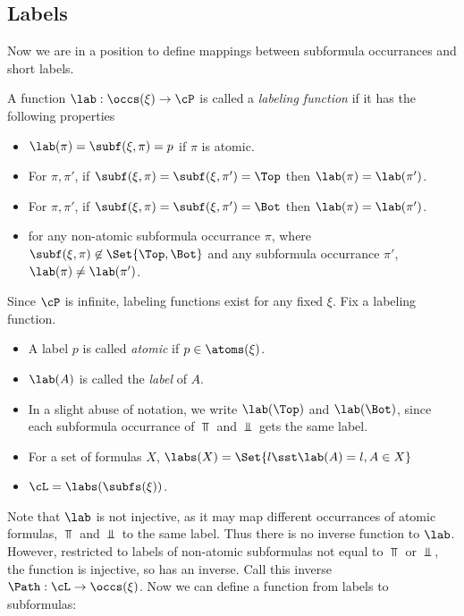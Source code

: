 \subsection{Labels}

Now we are in a position to define mappings between subformula occurrances
and short labels.

\begin{definition}[Labeling]
  A function $\lab : \occs(\xi)\to\cP$ is called a \emph{labeling function} if
  it has the following properties
  \begin{itemize}
  \item $\lab(\pi) = \subf(\xi, \pi) = p$ if $\pi$ is atomic.
  \item For $\pi,\pi'$, if $\subf(\xi, \pi) = \subf(\xi, \pi') = \Top$
    then $\lab(\pi) = \lab(\pi')$.
  \item For $\pi,\pi'$, if $\subf(\xi, \pi) = \subf(\xi, \pi') = \Bot$
    then $\lab(\pi) = \lab(\pi')$.
  \item for any non-atomic subformula occurrance $\pi$, where
    $\subf(\xi, \pi)\not\in \Set{\Top,\Bot}$ and any subformula occurrance $\pi'$,
    $\lab(\pi) \neq \lab(\pi')$.
  \end{itemize}
  Since $\cP$ is infinite, labeling functions exist for any fixed $\xi$.  Fix
  a labeling function.
  \begin{itemize}
  \item A label $p$ is called \emph{atomic} if $p\in\atoms(\xi)$.
  \item $\lab(A)$ is called the \emph{label} of $A$.
  \item In a slight abuse of notation, we write $\lab(\Top)$ and $\lab(\Bot)$,
    since each subformula occurrance of $\Top$ and $\Bot$ gets the same label.
  \item For a set of formulas $X$, $\labs(X) = \Set{l\sst \lab(A) = l, A\in X}$
  \item $\cL = \labs(\subfs(\xi))$.
  \end{itemize}
\end{definition}

\noindent
Note that $\lab$ is not injective, as it may map different occurrances of
atomic formulas, $\Top$ and $\Bot$ to the same label.  Thus there is
no inverse function to $\lab$.  However, restricted to labels of non-atomic
subformulas not equal to $\Top$ or $\Bot$, the function is injective, so
has an inverse.  Call this inverse $\Path : \cL\to\occs(\xi)$.
Now we can define a function from labels to subformulas:

